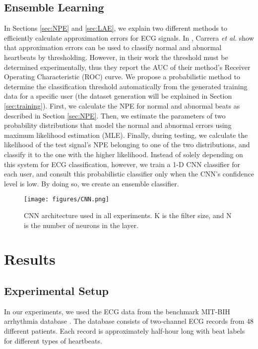 \documentclass[journal,transmag]{IEEEtran}
\begin{document}
\subsection{Ensemble Learning} \label{sec:ensemble_learning}
In Sections \ref{sec:NPE} and \ref{sec:LAE}, we explain two different methods to efficiently calculate approximation errors for ECG signals. In \cite{carrera2016ecg}, Carrera \textit{et al.} show that approximation errors can be used to classify normal and abnormal heartbeats by thresholding. However, in their work the threshold must be determined experimentally, thus they report the AUC of their method's Receiver Operating Characteristic (ROC) curve. We propose a probabilistic method to determine the classification threshold automatically from the generated training data for a specific user (the dataset generation will be explained in Section \ref{sec:training}). First, we calculate the NPE for normal and abnormal beats as described in Section \ref{sec:NPE}. Then, we estimate the parameters of two probability distributions that model the normal and abnormal errors using maximum likelihood estimation (MLE). Finally, during testing, we calculate the likelihood of the test signal's NPE belonging to one of the two distributions, and classify it to the one with the higher likelihood. Instead of solely depending on this system for ECG classification, however, we train a 1-D CNN classifier for each user, and consult this probabilistic classifier only when the CNN's confidence level is low. By doing so, we create an ensemble classifier.

\begin{figure*}
    \captionsetup{font=footnotesize}
    \centering
    \texttt{[image: figures/CNN.png]}
    \caption{CNN architecture used in all experiments. K is the filter size, and N is the number of neurons in the layer.}
    \label{fig:cnn_arch}
\end{figure*}

\section{Results} \label{sec:results}
\subsection{Experimental Setup}
In our experiments, we used the ECG data from the benchmark MIT-BIH arrhythmia database \cite{moody2001impact,goldberger2000physiobank}. The database consists of two-channel ECG records from 48 different patients. Each record is approximately half-hour long with beat labels for different types of heartbeats.
\end{document}
